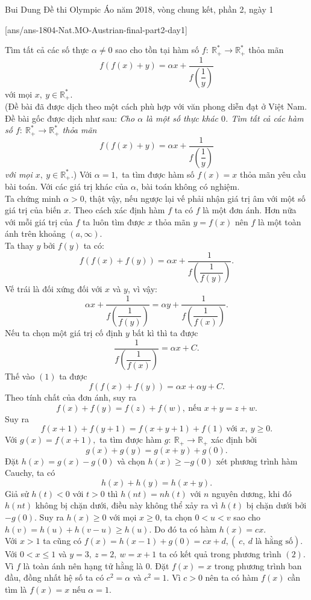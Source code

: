
\begin{name}
{Bui Dung}
{Đề thi Olympic Áo năm 2018, vòng chung kết, phần 2, ngày 1}
\end{name}
\setcounter{ex}{0}
[ans/ans-1804-Nat.MO-Austrian-final-part2-day1]
\begin{ex}%
Tìm tất cả các số thực $\alpha \ne 0$ sao cho tồn tại hàm số $f:\ \mathbb{R}_+^*\rightarrow \mathbb{R}_+^*$ thỏa mãn\[f(f(x)+y)=\alpha x+\dfrac{1}{f\left(\dfrac{1}{y}\right)}\] với mọi $x,\ y\in\mathbb{R}_+^*$.\\
(Đề bài đã được dịch theo một cách phù hợp với văn phong diễn đạt ở Việt Nam. Đề bài gốc được dịch như sau: {\it Cho $\alpha$ là một số thực khác $0$. Tìm tất cả các hàm số $f:\ \mathbb{R}_+^*\rightarrow \mathbb{R}_+^*$ thỏa mãn\[f(f(x)+y)=\alpha x+\dfrac{1}{f\left(\dfrac{1}{y}\right)}\] với mọi $x,\ y\in\mathbb{R}_+^*$.})
	\loigiai
	{
Với $\alpha=1,$ ta tìm được hàm số $f(x)=x$ thỏa mãn yêu cầu bài toán. Với các giá trị khác của $\alpha$, bài toán không có nghiệm.\\
Ta chứng minh  $\alpha>0$, thật vậy, nếu ngược lại vế phải nhận giá trị  âm với một số giá trị của biến $x$.  Theo cách xác định  hàm $f$ ta có $f$ là một đơn ánh. Hơn nữa với mỗi giá trị của $f$ ta luôn tìm được $x$ thỏa mãn $y=f(x)$  nên $f$ là một toàn ánh trên khoảng $(a,\infty)$. \\
Ta thay $y$ bởi $f(y)$ ta có: \[f(f(x)+f(y))=\alpha x+\dfrac{1}{f\left(\dfrac{1}{f(y)}\right)}.\tag{1}\]
Vế trái là đối xứng đối với $x$ và $y$, vì vậy: 
\[\alpha x+\dfrac{1}{f\left(\dfrac{1}{f(y)}\right)}=\alpha y+\dfrac{1}{f\left(\dfrac{1}{f(x)}\right)}.\]
 Nếu ta chọn một giá trị cố định $y$ bất kì thì ta được
\[\dfrac{1}{f\left(\dfrac{1}{f(x)}\right)}=\alpha x+C.\]
Thế vào $(1)$ ta được \[f(f(x)+f(y))=\alpha x+\alpha y+C.\]
Theo tính chất của đơn ánh, suy ra \[f(x)+f(y)=f(z)+f(w),\ \mbox{nếu }x+y=z+w.\tag{2}\] 
Suy ra \[f(x+1)+f(y+1)=f(x+y+1)+f(1)\ \mbox{với }x,\ y\geq0.\]
Với $g(x)=f(x+1),$ ta tìm được hàm $g:\ \mathbb{R}_+\rightarrow\mathbb{R}_+$ xác định bởi
\[g(x)+g(y)=g(x+y)+g(0).\]
Đặt $h(x)=g(x)-g(0)$ và chọn $h(x)\geq-g(0)$ xét phương trình hàm Cauchy, ta có
\[h(x)+h(y)=h(x+y).\]	
Giả sử $h(t)<0$ với $t>0$ thì $h(nt)=nh(t)$ với $n$ nguyên dương, khi đó $h(nt)$ không bị chặn dưới, điều này không thể xảy ra vì $h(t)$ bị chặn dưới bởi $-g(0)$. Suy ra $h(x)\geq0$ với mọi $x\geq0$, ta chọn $0<u<v$ sao cho $h(v)=h(u)+h(v-u)\geq h(u)$.
Do đó ta có hàm $h(x)=cx$. \\
Với $x>1$ ta cũng có $f(x)=h(x-1)+g(0)=cx+d,(\ c,\ d\mbox{ là hằng số})$. Với $0<x\leq1$ và $y=3,\ z=2,\ w=x+1$ ta có kết quả trong phương trình $(2)$.\\
Vì $f$ là toàn ánh nên hạng tử hằng là $0$. Đặt $f(x)=x$ trong phương trình ban đầu, đồng nhất hệ số ta có $c^2=\alpha$ và $c^2=1$. Vì $c>0$ nên ta có hàm $f(x)$ cần tìm là $f(x)=x$ nếu $\alpha=1$.
}
\end{ex}
